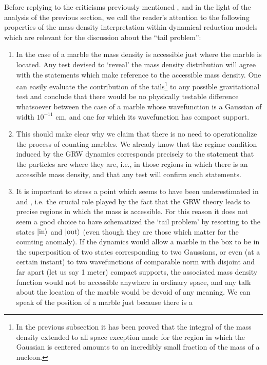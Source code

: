 \documentclass[12pt]{article}
\begin{document}
Before replying to the criticisms previously mentioned
\cite{shi90,alo1,lew,cli1,cli2}, and in the light of the analysis
of the previous section, we call the reader's attention to the
following properties of the mass density interpretation within
dynamical reduction models which are relevant for the discussion
about the ``tail problem'':
\begin{enumerate}
\item In the case of a marble the mass density is accessible just
where the marble is located. Any test devised to `reveal' the mass
density distribution will agree with the statements which make
reference to the accessible mass density. One can easily evaluate
the contribution of the tails\footnote{In the previous subsection
it has been proved that the integral of the mass density extended
to all space exception made for the region in which the Gaussian
is centered amounts to an incredibly small fraction of the mass of
a nucleon.} to any possible gravitational test and conclude that
there would be no physically testable difference whatsoever
between the case of a marble whose wavefunction is a Gaussian of
width $10^{-11}$ cm, and one for which its wavefunction has
compact support.
\item This should make clear why we claim that there is no need to
operationalize the process of counting marbles. We already know
that the regime condition induced by the GRW dynamics corresponds
precisely to the statement that the particles are where they are,
i.e., in those regions in which there is an accessible mass
density, and that any test will confirm such statements.
\item It is important to stress a point which seems to have been
underestimated in \cite{cli1} and \cite{cli2}, i.e. the crucial
role played by the fact that the GRW theory leads to precise
regions in which the mass is accessible. For this reason it does
not seem a good choice to have schematized the `tail problem' by
resorting to the states $|\makebox{in}\rangle$ and
$|\makebox{out}\rangle$ (even though they are those which matter
for the counting anomaly). If the dynamics would allow a marble in
the box to be in the superposition of two states corresponding to
two Gaussians, or even (at a certain instant) to two wavefunctions
of comparable norm with disjoint and far apart (let us say 1
meter) compact supports, the associated mass density function
would not be accessible anywhere in ordinary space, and any talk
about the location of the marble would be devoid of any meaning.
We can speak of the position of a marble just because there is a

\end{enumerate}
\end{document}
